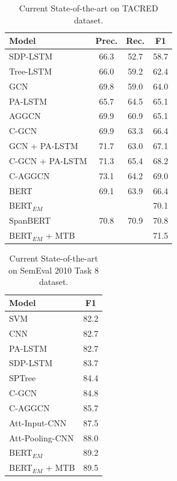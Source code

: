 \begin{table}[ht]
\small
\centering
\begin{tabular}{l|ccc}
\hline
Model     & Prec. & Rec.  & F1   \\ \hline
SDP-LSTM   & 66.3 & 52.7 & 58.7 \\ 
Tree-LSTM  & 66.0 & 59.2 & 62.4 \\ 
GCN        & 69.8 & 59.0 & 64.0 \\ 
PA-LSTM    & 65.7 & 64.5 & 65.1 \\ 
AGGCN      & 69.9 & 60.9 & 65.1 \\ 
C-GCN      & 69.9 & 63.3 & 66.4 \\ 
GCN + PA-LSTM        & 71.7 & 63.0 & 67.1 \\ 
C-GCN + PA-LSTM      & 71.3 & 65.4 & 68.2 \\ 
C-AGGCN   & 73.1 & 64.2 & 69.0 \\ \hline
BERT    & 69.1 & 63.9 & 66.4 \\ 
BERT$_{EM}$  &   &  & 70.1 \\ 
SpanBERT  & 70.8 & 70.9 & 70.8 \\ 
BERT$_{EM}$ + MTB  &  &  & 71.5 \\ \hline
\end{tabular}
\caption{Current State-of-the-art on TACRED dataset.}
\label{tab:tacred_sota}
\end{table}
\begin{table}[ht]
\small
\centering
\begin{tabular}{l|c}
\hline
Model     & F1   \\ \hline
SVM   & 82.2 \\ 
CNN   & 82.7 \\ 
PA-LSTM    & 82.7 \\ 
SDP-LSTM   & 83.7 \\
SPTree  & 84.4 \\ 
C-GCN      & 84.8 \\ 
C-AGGCN   & 85.7 \\ 
Att-Input-CNN  & 87.5 \\ 
Att-Pooling-CNN  & 88.0 \\ \hline
BERT$_{EM}$  & 89.2 \\ 
BERT$_{EM}$ + MTB  & 89.5 \\ \hline
\end{tabular}
\caption{Current State-of-the-art on SemEval 2010 Task 8 dataset.}
\label{tab:semeval_sota}
\end{table}
